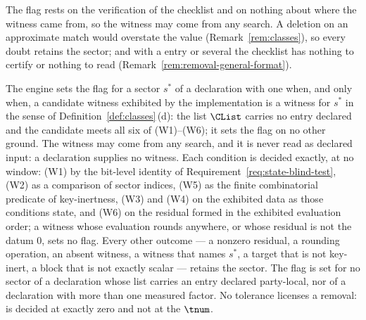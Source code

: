 
The flag rests on the verification of the checklist and on nothing about
where the witness came from, so the witness may come from any search. A
deletion on an approximate match would overstate the value
(Remark~\ref{rem:classes}), so every doubt retains the sector; and with a
 entry or several
 the checklist has nothing to
certify or nothing to read (Remark~\ref{rem:removal-general-format}).

\begin{requirement}\label{req:removal-checklist}
The engine sets the flag  for a sector $s^{*}$ of a
declaration with one  when, and only when, a candidate
witness exhibited by the implementation is a witness for $s^{*}$ in the
sense of Definition~\ref{def:classes}\,(d): the list $\CList$ carries no
entry declared  and the candidate meets all six of
(W1)--(W6); it sets the flag on no other ground. The
witness may come from any search, and it is never read as declared input: a
declaration supplies no witness. Each condition is decided exactly, at no
window: (W1) by the bit-level identity of
Requirement~\ref{req:state-blind-test}, (W2) as a comparison of sector
indices, (W5) as the finite combinatorial predicate of key-inertness, (W3)
and (W4) on the exhibited data as those conditions state, and (W6) on the
residual formed in the exhibited evaluation order; a witness whose
evaluation rounds anywhere, or whose residual is not the datum $0$, sets no
flag. Every other outcome --- a nonzero residual, a rounding operation, an
absent witness, a witness that names $s^{*}$, a target that is not
key-inert, a block that is not exactly scalar --- retains the sector. The
flag is set for no sector of a declaration whose list carries an entry
declared party-local, nor of a declaration with more than one measured
factor. No tolerance licenses a removal:
 is decided at exactly zero and not at the
 $\tnum$.
\end{requirement}
